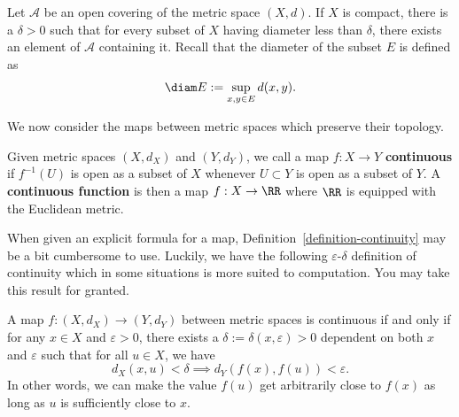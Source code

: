 \documentclass[11pt]{article}
\begin{document}
    \begin{thm}
        Let $\mathcal{A}$ be an open covering of the metric space $(X, d)$. If $X$ is compact, there is a $\delta > 0$ such that for every subset of $X$ having diameter less than $\delta$, there exists an element of $\mathcal{A}$ containing it. Recall that the diameter of the subset $E$ is defined as 
        \[
            \diam E := \sup_{x, y \in E} d(x, y). 
        \]
    \end{thm}
    We now consider the maps between metric spaces which preserve their topology. 
    
    \begin{defn} \label{definition-continuity}
        Given metric spaces $(X, d_X)$ and $(Y, d_Y)$, we call a map $f : X \to Y$ \textbf{continuous} if $f^{-1}(U)$ is open as a subset of $X$ whenever $U \subset Y$ is open as a subset of $Y$. A \textbf{continuous function} is then a map $f : X \to \RR$ where $\RR$ is equipped with the Euclidean metric. 
    \end{defn}
    
    When given an explicit formula for a map, Definition~\ref{definition-continuity} may be a bit cumbersome to use. Luckily, we have the following $\varepsilon$-$\delta$ definition of continuity which in some situations is more suited to computation. You may take this result for granted.

    \begin{prop}
        A map $f : (X, d_X) \to (Y, d_Y)$ between metric spaces is continuous if and only if for any $x \in X$ and $\varepsilon > 0$, there exists a $\delta := \delta(x, \varepsilon) > 0$ dependent on both $x$ and $\varepsilon$ such that for all $u \in X$, we have
        \[
            d_X(x, u) < \delta \implies d_Y(f(x), f(u)) < \varepsilon. 
        \]
        In other words, we can make the value $f(u)$ get arbitrarily close to $f(x)$ as long as $u$ is sufficiently close to $x$.
    \end{prop}
\end{document}
